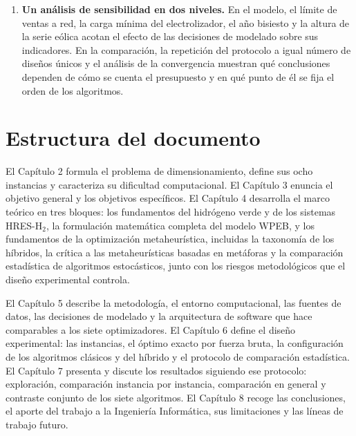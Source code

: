 \begin{enumerate}
    \item \textbf{Un análisis de sensibilidad en dos niveles.} En el modelo, el límite de ventas a red, la carga mínima del electrolizador, el año bisiesto y la altura de la serie eólica acotan el efecto de las decisiones de modelado sobre sus indicadores. En la comparación, la repetición del protocolo a igual número de diseños únicos y el análisis de la convergencia muestran qué conclusiones dependen de cómo se cuenta el presupuesto y en qué punto de él se fija el orden de los algoritmos.
\end{enumerate}

\section{Estructura del documento}

El Capítulo 2 formula el problema de dimensionamiento, define sus ocho instancias y caracteriza su dificultad computacional. El Capítulo 3 enuncia el objetivo general y los objetivos específicos. El Capítulo 4 desarrolla el marco teórico en tres bloques: los fundamentos del hidrógeno verde y de los sistemas HRES-H$_2$, la formulación matemática completa del modelo WPEB, y los fundamentos de la optimización metaheurística, incluidas la taxonomía de los híbridos, la crítica a las metaheurísticas basadas en metáforas y la comparación estadística de algoritmos estocásticos, junto con los riesgos metodológicos que el diseño experimental controla.

El Capítulo 5 describe la metodología, el entorno computacional, las fuentes de datos, las decisiones de modelado y la arquitectura de software que hace comparables a los siete optimizadores. El Capítulo 6 define el diseño experimental: las instancias, el óptimo exacto por fuerza bruta, la configuración de los algoritmos clásicos y del híbrido y el protocolo de comparación estadística. El Capítulo 7 presenta y discute los resultados siguiendo ese protocolo: exploración, comparación instancia por instancia, comparación en general y contraste conjunto de los siete algoritmos. El Capítulo 8 recoge las conclusiones, el aporte del trabajo a la Ingeniería Informática, sus limitaciones y las líneas de trabajo futuro.
